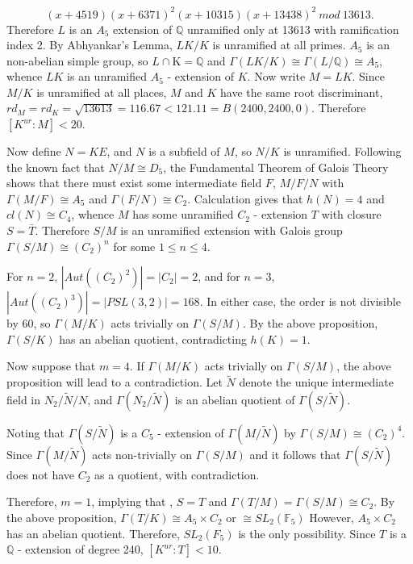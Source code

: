 \documentclass[12pt]{extarticle}
\newcommand{\Q}{\mathbb{Q}}
\newcommand{\<}{\langle}
\renewcommand{\>}{\rangle}
\theoremstyle{definition}
\begin{document}
\begin{equation}
(x+4519)(x+6371)^2(x+10315)(x+13438)^2 \: mod \: 13613.
\end{equation}
Therefore $L$ is an $A_5$ extension of $\Q$ unramified only at 13613 with ramification index 2. By Abhyankar's Lemma, $LK/K$ is unramified at all primes. $A_5$ is an non-abelian simple group, so $L \cap $K$ = \Q$ and $\Gamma(LK/K) \cong \Gamma(L/\Q) \cong A_5$, whence $LK$ is an unramified $A_5$ - extension of $K$.
Now write $M=LK$. Since $M/K$ is unramified at all places, $M$ and $K$ have the same root discriminant, $rd_M = rd_K = \sqrt{13613} = 116.67 < 121.11 = B(2400,2400,0)$. Therefore $[K^{ur}:M]<20$. \par
Now define $N=KE$, and $N$ is a subfield of $M$, so $N/K$ is unramified. Following the known fact that $N/M \cong D_5$, the Fundamental Theorem of Galois Theory shows that there must exist some intermediate field $F$, $M/F/N$ with $\Gamma(M/F) \cong A_5$ and $\Gamma(F/N) \cong C_2$. Calculation gives that $h(N)=4$ and $cl(N) \cong C_4$, whence $M$ has some unramified $C_2$ - extension $T$ with closure $S = \bar{T}$. Therefore $S/M$ is an unramified extension with Galois group $\Gamma(S/M) \cong \left(C_2 \right)^{n}$ for some $1 \leq n \leq 4$. \par
For $n=2$, $|Aut((C_2)^2)| = |C_2| = 2$, and for $n=3$, $|Aut((C_2)^3)| = |PSL(3,2)| = 168$. In either case, the order is not divisible by 60, so $\Gamma(M/K)$ acts trivially on $\Gamma(S/M)$. By the above proposition, $\Gamma(S/K)$ has an abelian quotient, contradicting $h(K)=1$. \par
Now suppose that $m=4$. 
If $\Gamma(M/K)$ acts trivially on $\Gamma(S/M)$, the above proposition will lead to a contradiction. Let $\tilde{N}$ denote the unique intermediate field in $N_2/\tilde{N}/N$, and $\Gamma(N_2/\tilde{N})$ is an abelian quotient of $\Gamma(S/\tilde{N})$. \par 
Noting that  $\Gamma(S/\tilde{N})$ is a $C_5$ - extension of
$\Gamma(M/\tilde{N})$ by $\Gamma(S/M) \cong (C_2)^{4}$. Since 
$\Gamma(M/\tilde{N})$ acts non-trivially on $\Gamma(S/M)$
 and it follows that  $\Gamma(S/\tilde{N})$ does not have $C_2$ as a quotient, with contradiction. \par
Therefore, $m = 1$, implying that , $S=T$ and $\Gamma(T/M) = \Gamma(S/M) \cong C_2$. By the above proposition, $\Gamma(T/K) \cong A_5 \times C_2$  or $\cong SL_2(\mathbb{F}_5)$ However, $A_5 \times C_2$ has an abelian quotient. Therefore,  $SL_2(F_5)$ is the only possibility. Since $T$ is a $\Q$ - extension of degree 240, $[K^{ur}:T] < 10$. 
\end{document}
